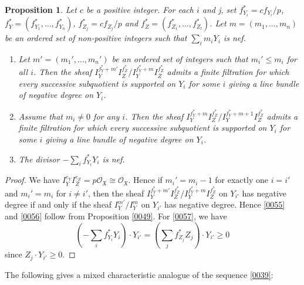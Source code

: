 \documentclass{amsart}
\newtheorem{Prop}[Thm]{Proposition}
\theoremstyle{remark}
\numberwithin{equation}{section}
\newcommand{\Order}{\mathcal{O}}
\begin{document}
\begin{Prop} \label{0054}
	Let $c$ be a positive integer.
	For each $i$ and j, set $f_{Y_{i}}^{\ast} = c f_{Y_{i}} / p$,
	$f_{Y}^{\ast} = (f_{Y_{1}}^{\ast}, \dots, f_{Y_{n}}^{\ast})$,
	$f_{Z_{j}}^{\ast} = c f_{Z_{j}} / p$ and
	$f_{Z}^{\ast} = (f_{Z_{1}}^{\ast}, \dots, f_{Z_{l}}^{\ast})$.
	Let $m = (m_{1}, \dots, m_{n})$ be
	an ordered set of non-positive integers
	such that $\sum_{i} m_{i} Y_{i}$ is nef.
	\begin{enumerate}
		\item \label{0055}
			Let $m' = (m_{1}', \dots, m_{n}')$ be an ordered set of integers
			such that $m_{i}' \le m_{i}$ for all $i$.
			Then the sheaf
			$I_{Y}^{f_{Y}^{\ast} + m'} I_{Z}^{f_{Z}^{\ast}} / I_{Y}^{f_{Y}^{\ast} + m} I_{Z}^{f_{Z}^{\ast}}$
			admits a finite filtration
			for which every successive subquotient is supported on $Y_{i}$ for some $i$
			giving a line bundle of negative degree on $Y_{i}$.
		\item \label{0056}
			Assume that $m_{i} \ne 0$ for any $i$.
			Then the sheaf
			$I_{Y}^{f_{Y}^{\ast} + m} I_{Z}^{f_{Z}^{\ast}} / I_{Y}^{f_{Y}^{\ast} + m + 1} I_{Z}^{f_{Z}^{\ast}}$
			admits a finite filtration
			for which every successive subquotient is supported on $Y_{i}$ for some $i$
			giving a line bundle of negative degree on $Y_{i}$.
		\item \label{0057}
			The divisor $- \sum_{i} f_{Y_{i}}^{\ast} Y_{i}$ is nef.
	\end{enumerate}
\end{Prop}

\begin{proof}
	We have $I_{Y}^{e_{Y}} I_{Z}^{e_{Z}} = p \Order_{\mathfrak{X}} \cong \Order_{\mathfrak{X}}$.
	Hence if $m_{i}' = m_{i} - 1$ for exactly one $i = i'$
	and $m_{i}' = m_{i}$ for $i \ne i'$, then the sheaf
	$I_{Y}^{f_{Y}^{\ast} + m'} I_{Z}^{f_{Z}^{\ast}} / I_{Y}^{f_{Y}^{\ast} + m} I_{Z}^{f_{Z}^{\ast}}$
	on $Y_{i'}$ has negative degree if and only if the sheaf
	$I_{Y}^{m'} / I_{Y}^{m}$ on $Y_{i'}$ has negative degree.
	Hence \eqref{0055} and \eqref{0056} follow from
	Proposition \ref{0049}.
	For \eqref{0057}, we have
		\[
				\left(
					- \sum_{i} f_{Y_{i}}^{\ast} Y_{i}
				\right) \cdot Y_{i'}
			=
				\left(
					\sum_{j} f_{Z_{j}}^{\ast} Z_{j}
				\right) \cdot Y_{i'}
			\ge
				0
		\]
	since $Z_{j} \cdot Y_{i'} \ge 0$.
\end{proof}

The following gives a mixed characteristic analogue of the sequence \eqref{0039}:
\end{document}
